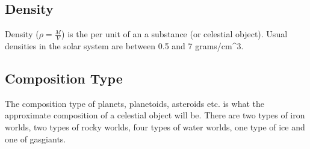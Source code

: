 \documentclass[letterpaper,10pt,english]{sphinxmanual}
\begin{document}
\subsection{Density}
\label{\detokenize{quantities/material/density:density}}\label{\detokenize{quantities/material/density::doc}}\label{\detokenize{quantities/material/density:id1}}
\sphinxAtStartPar
Density (\(\rho = \frac{M}{V}\)) is the {\hyperref[\detokenize{quantities/material/mass:id1}]{}} per unit {\hyperref[\detokenize{quantities/geometric/volume:id1}]{}} of an a substance (or celestial object).
Usual densities in the solar system are between 0.5 and 7 grams/cm\textasciicircum{}3.


\subsection{Composition Type}
\label{\detokenize{quantities/material/composition_type:composition-type}}\label{\detokenize{quantities/material/composition_type::doc}}\label{\detokenize{quantities/material/composition_type:id1}}
\sphinxAtStartPar
The composition type of planets, planetoids, asteroids etc. is
what the approximate composition of a celestial object will be.
There are two types of iron worlds, two types of rocky worlds,
four types of water worlds, one type of ice\sphinxhyphen{} and one of gas\sphinxhyphen{}giants.
\end{document}
